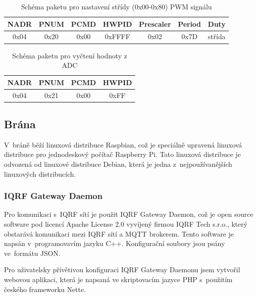 \documentclass[12pt,a4paper]{article}
\begin{document}
\begin{table}[H]
\centering
\begin{tabular}{|c|c|c|c|c|c|c|}
\hline
NADR & PNUM & PCMD & HWPID & Prescaler & Period & Duty \\
\hline
0x04 & 0x20 & 0x00 & 0xFFFF & 0x02 & 0x7D & střída \\
\hline
\end{tabular}
\caption{Schéma paketu pro nastavení střídy (0x00-0x80) PWM signálu}\label{table:iqrf/dpa-pwm}
\end{table}

\begin{table}[H]
\centering
\begin{tabular}{|c|c|c|c|}
\hline
NADR & PNUM & PCMD & HWPID \\
\hline
0x04 & 0x21 & 0x00 & 0xFF \\
\hline
\end{tabular}
\caption{Schéma paketu pro vyčtení hodnoty z ADC}\label{table:iqrf/dpa-adc}
\end{table}

\newpage

\subsection{Brána}

V~bráně běží linuxová distribuce Raspbian, což je speciálně upravená linuxová distribuce pro jednodeskový počítač Raspberry Pi. Tato linuxová distribuce je odvozená od linuxové distribuce Debian, která je jedna z~nejpoužívanějších linuxových distribucích.

\subsubsection{IQRF Gateway Daemon}

Pro komunikaci s~IQRF sítí je použit IQRF Gateway Daemon\cite{iqrfsdk/iqrf-daemon}, což je open source software pod licencí Apache License 2.0 vyvíjený firmou IQRF Tech s.r.o., který obstarává komunikaci mezi IQRF sítí a MQTT brokerem. Tento software je napsán v~programovavím jazyku C++. Konfigurační soubory jsou psány ve~formátu JSON.

Pro uživatelsky přívětivou konfiguraci IQRF Gateway Daemonu jsem vytvořil webovou aplikaci\cite{iqrfsdk/iqrf-daemon-webapp}, která je napsaná ve skriptovacím jazyce PHP s~použitím českého frameworku Nette\cite{nette}.
\end{document}
